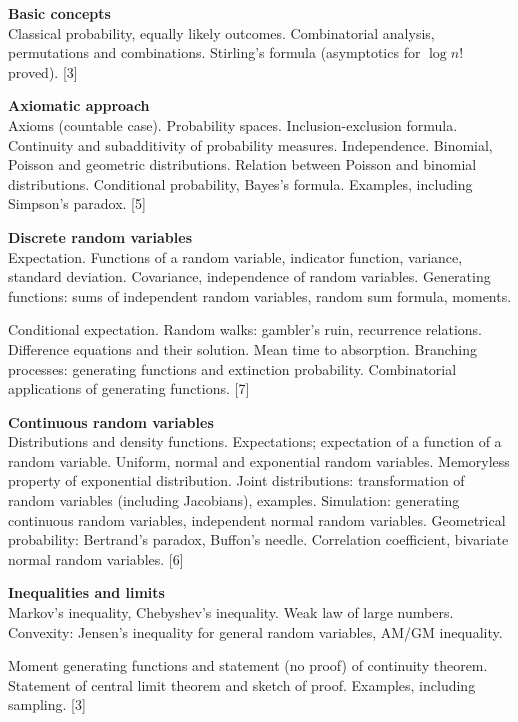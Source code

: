 \documentclass[a4paper]{article}
\begin{document}
\maketitle
{\small
  \noindent\textbf{Basic concepts}\\
  Classical probability, equally likely outcomes. Combinatorial analysis, permutations and combinations.  Stirling's formula (asymptotics for $\log n!$ proved).\hspace*{\fill}  [3]

  \vspace{10pt}
  \noindent\textbf{Axiomatic approach}\\
  Axioms (countable case). Probability spaces. Inclusion-exclusion formula. Continuity and subadditivity of probability measures. Independence. Binomial, Poisson and geometric distributions. Relation between Poisson and binomial distributions. Conditional probability, Bayes's formula. Examples, including Simpson's paradox.\hspace*{\fill} [5]

  \vspace{10pt}
  \noindent\textbf{Discrete random variables}\\
  Expectation. Functions of a random variable, indicator function, variance, standard deviation. Covariance, independence of random variables. Generating functions: sums of independent random variables, random sum formula, moments.

  \vspace{5pt}
  \noindent Conditional expectation. Random walks: gambler's ruin, recurrence relations. Difference equations and their solution. Mean time to absorption. Branching processes: generating functions and extinction probability. Combinatorial applications of generating functions.\hspace*{\fill} [7]

  \vspace{10pt}
  \noindent\textbf{Continuous random variables}\\
  Distributions and density functions. Expectations; expectation of a function of a random variable.  Uniform, normal and exponential random variables. Memoryless property of exponential distribution.  Joint distributions: transformation of random variables (including Jacobians), examples. Simulation: generating continuous random variables, independent normal random variables. Geometrical probability: Bertrand's paradox, Buffon's needle. Correlation coefficient, bivariate normal random variables.\hspace*{\fill} [6]

  \vspace{10pt}
  \noindent\textbf{Inequalities and limits}\\
  Markov's inequality, Chebyshev's inequality. Weak law of large numbers. Convexity: Jensen's inequality for general random variables, AM/GM inequality.

  \vspace{5pt}
  \noindent Moment generating functions and statement (no proof) of continuity theorem. Statement of central limit theorem and sketch of proof. Examples, including sampling.\hspace*{\fill} [3]}
\end{document}
